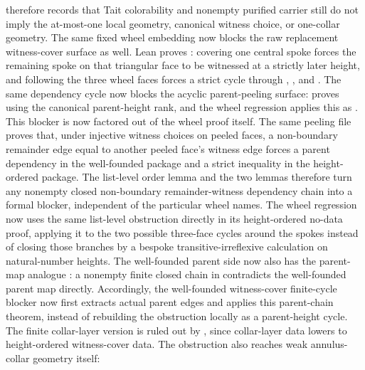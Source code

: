 \documentclass[11pt]{article}
\begin{document}
therefore records that Tait colorability and nonempty purified carrier still
do not imply the at-most-one local geometry, canonical witness choice, or
one-collar geometry.
The same fixed wheel embedding now blocks the raw replacement witness-cover
surface as well.  Lean proves
:
covering one central spoke forces the remaining spoke on that triangular face
to be witnessed at a strictly later height, and following the three wheel faces
forces a strict cycle through , , and .
The same dependency cycle now blocks the acyclic parent-peeling surface:
 proves
using the canonical parent-height rank, and the wheel regression applies this
as
.
This blocker is now factored out of the wheel proof itself.  The same peeling
file proves that, under injective witness choices on peeled faces, a
non-boundary remainder edge equal to another peeled face's witness edge forces a
parent dependency in the well-founded package and a strict inequality in the
height-ordered package.  The list-level order lemma
 and the two
 lemmas
therefore turn any nonempty closed non-boundary remainder-witness dependency
chain into a formal blocker, independent of the particular wheel names.
The wheel regression now uses the same list-level obstruction directly in its
height-ordered no-data proof, applying it to the two possible three-face
cycles around the spokes instead of closing those branches by a bespoke
transitive-irreflexive calculation on natural-number heights.
The well-founded parent side now also has the parent-map analogue
: a nonempty finite
closed chain in  contradicts the well-founded parent map
directly.  Accordingly, the well-founded witness-cover finite-cycle blocker
now first extracts actual parent edges and applies this parent-chain theorem,
instead of rebuilding the obstruction locally as a parent-height cycle.
The finite collar-layer version is ruled out by
,
since collar-layer data lowers to height-ordered witness-cover data.  The
obstruction also reaches weak annulus-collar geometry itself:
\end{document}
